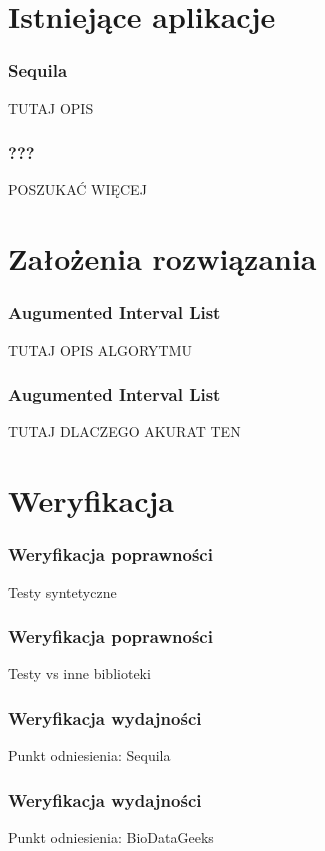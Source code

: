 \documentclass[aspectratio=169]{beamer}
\begin{document}
\section{Istniejące aplikacje}
	\begin{frame}
		\frametitle{Sequila}
		TUTAJ OPIS
	\end{frame}
	
	\begin{frame}
		\frametitle{???}
		POSZUKAĆ WIĘCEJ
	\end{frame}
	
\section{Założenia rozwiązania}
	\begin{frame}
		\frametitle{Augumented Interval List}
		TUTAJ OPIS ALGORYTMU
	\end{frame}
	
	\begin{frame}
		\frametitle{Augumented Interval List}
		TUTAJ DLACZEGO AKURAT TEN
	\end{frame}

\section{Weryfikacja}
	
	\begin{frame}
		\frametitle{Weryfikacja poprawności}
		Testy syntetyczne
	\end{frame}
	
	\begin{frame}
		\frametitle{Weryfikacja poprawności}
		Testy vs inne biblioteki
	\end{frame}

	\begin{frame}
		\frametitle{Weryfikacja wydajności}
		Punkt odniesienia: Sequila
	\end{frame}

	\begin{frame}
		\frametitle{Weryfikacja wydajności}
		Punkt odniesienia: BioDataGeeks
	\end{frame}
\end{document}
